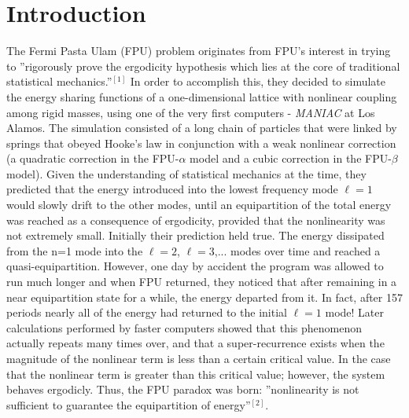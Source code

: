 \documentclass[twocolumn]{article}
\begin{document}
\section{Introduction} 
\hspace{\parindent}The Fermi Pasta Ulam (FPU) problem originates from FPU's interest in trying to ''rigorously prove the ergodicity hypothesis which lies at the core
of traditional statistical mechanics.''$^{[1]}$ In order to accomplish this, they decided to simulate the energy sharing functions of a one-dimensional lattice with nonlinear coupling among rigid masses, using one of the very first computers - \textit{MANIAC} at Los Alamos. The simulation consisted of a long chain of particles that were linked by springs that obeyed Hooke’s law in conjunction with a weak nonlinear correction (a quadratic correction in the FPU-$\alpha$ model and a cubic correction in the FPU-$\beta$ model). Given the understanding of statistical mechanics at the time, they predicted that the energy introduced into the lowest frequency mode $\ell=1$ would slowly drift to the other modes, until an equipartition of the total energy was reached as a consequence of ergodicity, provided that the nonlinearity was not extremely small. Initially their prediction held true. The energy dissipated from the n=1 mode into the $\ell=2$, $\ell=3$,... modes over time and reached a quasi-equipartition. However, one day by accident the program was allowed to run much longer and when FPU returned, they noticed that after remaining in a near equipartition state for a while, the energy departed from it. In fact, after 157 periods nearly all of the energy had returned to the initial $\ell=1$ mode! Later calculations performed by faster computers showed that this phenomenon actually repeats many times over, and that a super-recurrence exists when the magnitude of the nonlinear term is less than a certain critical value. In the case that the nonlinear term is greater than this critical value; however, the system behaves ergodicly. Thus, the FPU paradox was born: ''nonlinearity is not sufficient to guarantee the equipartition of energy''$^{[2]}$.
\end{document}
